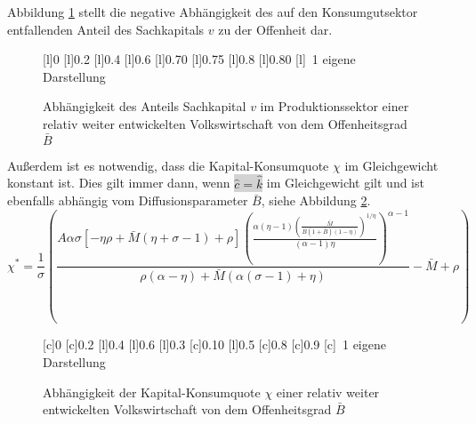 Abbildung \ref{fig:VeränderungSachkapitalOffenheit} stellt die negative Abhängigkeit des auf den Konsumgutsektor entfallenden Anteil des Sachkapitals $v$ zu der Offenheit dar. 
%
\begin{figure}[htb] 
\vspace{0.13cm}
 \centering 
		\psfrag{-}{  $_-$}
		[l]{\footnotesize{0}}
		[l]{\footnotesize{0.2}}
		[l]{\footnotesize{0.4}}
		[l]{\footnotesize{0.6}}
		[l]{\footnotesize{0.70}}
		[l]{\footnotesize{0.75}}
		[l]{\footnotesize{0.8}}
		[l]{\footnotesize{0.80}}
		[l]{~\footnotesize{1}}
	\hfill{}  eigene Darstellung
	\caption{Abhängigkeit des Anteils Sachkapital $v$ im Produktionssektor einer relativ weiter entwickelten Volkswirtschaft von dem Offenheitsgrad $\bar{B}$}
	\label{fig:VeränderungSachkapitalOffenheit}
\end{figure}
%
Außerdem ist es notwendig, dass die Kapital-Konsumquote $\chi$ im Gleichgewicht konstant ist. Dies gilt immer dann, wenn \colorbox{lightgray}{$\hat{c}=\hat{k}$} im Gleichgewicht gilt und ist ebenfalls abhängig vom Diffusionsparameter $\bar{B}$, siehe Abbildung \ref{fig:ChiIL}.
%
\begin{equation}
	\boxed{
		\chi^*=\frac{1}{\sigma}\left(\frac{A\alpha \sigma[-\eta\rho+\bar{M}(\eta+\sigma-1)+\rho] \left(\frac{\alpha  (\eta -1) \left(\frac{\bar{M}}{B (1+\bar{B})(1-\eta) }\right)^{1/\eta }}{(\alpha -1) \eta }\right)^{\alpha -1}}{\rho  (\alpha -\eta )+\bar{M} (\alpha  (\sigma -1)+\eta )}-\bar{M}+\rho\right)
		}
\end{equation}
%
\begin{figure}[h!] 
\vspace{0.23cm}
 \centering 
		[c]{\footnotesize{0}}
		[c]{\footnotesize{0.2}}
		[l]{\footnotesize{0.4}}
		[l]{\footnotesize{0.6}}
		[l]{\footnotesize{0.3}}
		[c]{\footnotesize{0.10}}
		[l]{\footnotesize{0.5}}
		[c]{\footnotesize{0.8}}
		[c]{\footnotesize{0.9}}
		[c]{~\footnotesize{1}}
	\hfill{}  eigene Darstellung
	\caption{Abhängigkeit der Kapital-Konsumquote $\chi$ einer relativ weiter entwickelten Volkswirtschaft von dem Offenheitsgrad $\bar{B}$}
	\label{fig:ChiIL}
\end{figure}
%
